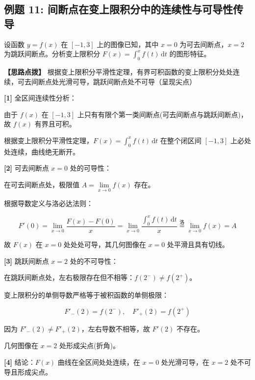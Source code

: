 \documentclass[11pt,a4paper,UTF8]{ctexart}
\begin{document}
\subsection{例题 11: 间断点在变上限积分中的连续性与可导性传导}

设函数 $y = f(x)$ 在 $[-1, 3]$ 上的图像已知，其中 $x = 0$ 为可去间断点，$x = 2$ 为跳跃间断点。分析变上限积分 $F(x) = \int_0^x f(t)\,\mathrm{d}t$ 的图形特征。

\textbf{\color{DeepPurple}【思路点拨】} 根据变上限积分平滑性定理，有界可积函数的变上限积分处处连续，可去间断点处光滑可导，跳跃间断点处不可导（呈现尖点）


\begin{solbox}[分步推导与答题规范]
\textbf{[1]} 全区间连续性分析：

由于 $f(x)$ 在 $[-1, 3]$ 上只有有限个第一类间断点(可去间断点与跳跃间断点)，故 $f(x)$ 有界且可积。

根据变上限积分平滑性定理，$F(x) = \int_0^x f(t)\,\mathrm{d}t$ 在整个闭区间 $[-1, 3]$ 上必处处连续，曲线绝无断开。

\textbf{[2]} 可去间断点 $x = 0$ 处的可导性：

在可去间断点处，极限值 $A = \lim\limits_{x \to 0} f(x)$ 存在。

根据导数定义与洛必达法则：


\begin{equation*}
F'(0) = \lim_{x \to 0} \frac{F(x) - F(0)}{x} = \lim_{x \to 0} \frac{\int_0^x f(t)\,\mathrm{d}t}{x} \stackrel{\text{洛}}{=} \lim_{x \to 0} f(x) = A
\end{equation*}


故 $F(x)$ 在 $x = 0$ 处处处可导，其几何图像在 $x = 0$ 处平滑且具有切线。

\textbf{[3]} 跳跃间断点 $x = 2$ 处的不可导性：

在跳跃间断点处，左右极限存在但不相等：$f(2^-) \neq f(2^+)$。

变上限积分的单侧导数严格等于被积函数的单侧极限：


\begin{equation*}
F'_-(2) = f(2^-), \quad F'_+(2) = f(2^+)
\end{equation*}


因为 $F'_-(2) \neq F'_+(2)$，左右导数不相等，故 $F'(2)$ 不存在。

几何图像在 $x = 2$ 处形成尖点(折角)。

\textbf{[4]} 结论：$F(x)$ 曲线在全区间处处连续，在 $x = 0$ 处光滑可导，在 $x = 2$ 处不可导且形成尖点。
\end{solbox}
\end{document}
